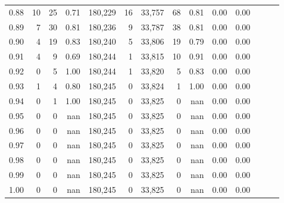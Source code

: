 \begin{tabular}{rrrrrrrrrrrrrr}
0.88 &      10 &     25 &  0.71 &  180,229 &       16 &  33,757 &      68 &  0.81 &  0.00 &      0.00 \\
0.89 &       7 &     30 &  0.81 &  180,236 &        9 &  33,787 &      38 &  0.81 &  0.00 &      0.00 \\
0.90 &       4 &     19 &  0.83 &  180,240 &        5 &  33,806 &      19 &  0.79 &  0.00 &      0.00 \\
0.91 &       4 &      9 &  0.69 &  180,244 &        1 &  33,815 &      10 &  0.91 &  0.00 &      0.00 \\
0.92 &       0 &      5 &  1.00 &  180,244 &        1 &  33,820 &       5 &  0.83 &  0.00 &      0.00 \\
0.93 &       1 &      4 &  0.80 &  180,245 &        0 &  33,824 &       1 &  1.00 &  0.00 &      0.00 \\
0.94 &       0 &      1 &  1.00 &  180,245 &        0 &  33,825 &       0 &   nan &  0.00 &      0.00 \\
0.95 &       0 &      0 &   nan &  180,245 &        0 &  33,825 &       0 &   nan &  0.00 &      0.00 \\
0.96 &       0 &      0 &   nan &  180,245 &        0 &  33,825 &       0 &   nan &  0.00 &      0.00 \\
0.97 &       0 &      0 &   nan &  180,245 &        0 &  33,825 &       0 &   nan &  0.00 &      0.00 \\
0.98 &       0 &      0 &   nan &  180,245 &        0 &  33,825 &       0 &   nan &  0.00 &      0.00 \\
0.99 &       0 &      0 &   nan &  180,245 &        0 &  33,825 &       0 &   nan &  0.00 &      0.00 \\
1.00 &       0 &      0 &   nan &  180,245 &        0 &  33,825 &       0 &   nan &  0.00 &      0.00 \\
\bottomrule
\end{tabular}
